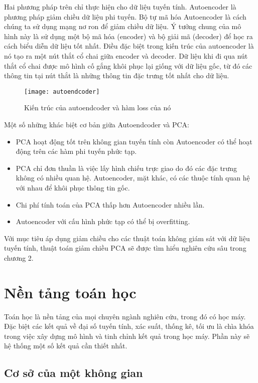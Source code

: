 Hai phương pháp trên chỉ thực hiện cho dữ liệu tuyến tính. Autoencoder là phương pháp giảm chiều dữ liệu phi tuyến. Bộ tự mã hóa Autoencoder là cách chúng ta sử dụng mạng nơ ron để giảm chiều dữ liệu. Ý tưởng chung của mô hình này là sử dụng một bộ mã hóa (encoder) và bộ giải mã (decoder) để học ra cách biểu diễn dữ liệu tốt nhất. Điều đặc biệt trong kiến trúc của autoencoder là nó tạo ra một nút thắt cổ chai giữa encoder và decoder. Dữ liệu khi đi qua nút thắt cổ chai được mô hình cố gắng khôi phục lại giống với dữ liệu gốc, từ đó các thông tin tại nút thắt là những thông tin đặc trưng tốt nhất cho dữ liệu. 
\begin{figure}
	\centering
	\texttt{[image: autoendcoder]}
	\caption{Kiến trúc của autoendcoder và hàm loss của nó}
	\label{fig:autoendcoder}
\end{figure}
Một số những khác biệt cơ bản giữa Autoendcoder và PCA:
\begin{itemize}
	\item PCA hoạt động tốt trên không gian tuyến tính còn Autoencoder có thể hoạt động trên các hàm phi tuyến phức tạp.
	\item PCA chỉ đơn thuần là việc lấy hình chiếu trực giao do đó các đặc trưng không có nhiều quan hệ. Autoencoder, mặt khác, có các thuộc tính quan hệ với nhau để khôi phục thông tin gốc.
	\item Chi phí tính toán của PCA thấp hơn Autoencoder nhiều lần.
	\item Autoencoder với cấu hình phức tạp có thể bị overfitting.
\end{itemize}

Với mục tiêu áp dụng giảm chiều cho các thuật toán không giám sát với dữ liệu tuyến tính, thuật toán giảm chiều PCA sẽ được tìm hiểu nghiên cứu sâu trong chương 2.

\section{Nền tảng toán học}
Toán học là nền tảng của mọi chuyên ngành nghiên cứu, trong đó có học máy. Đặc biệt các kết quả về đại số tuyến tính, xác suất, thống kê, tối ưu là chìa khóa trong việc xây dựng mô hình và tinh chỉnh kết quả trong học máy. Phần này sẽ hệ thống một số kết quả cần thiết nhất.
\subsection{Cơ sở của một không gian} %
\label{sub:co_so_cua_mot_khong_gian}

